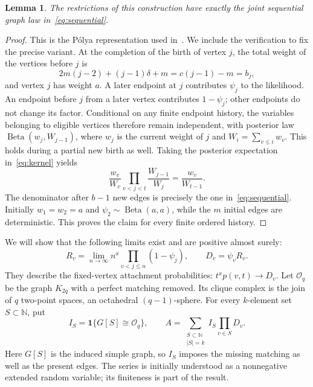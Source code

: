 \documentclass[11pt]{article}
\newtheorem{lemma}[theorem]{Lemma}
\theoremstyle{remark}\newtheorem{remark}[theorem]{Remark}
\newcommand{\N}{\mathbb N}
\newcommand{\ind}{\mathbf 1}
\newcommand{\cO}{\mathcal O}
\begin{document}
\begin{lemma}\label{lem:model}
The restrictions of this construction have exactly the joint sequential
graph law in~\eqref{eq:sequential}.
\end{lemma}
\begin{proof}
This is the P\'olya representation used in~\cite[Definition~5.1 and
Theorem~5.2 of the author preprint]{siu}. We include the verification to fix
the precise variant. At the completion of the birth of vertex $j$, the
total weight of the vertices before $j$ is
\[
 2m(j-2)+(j-1)\delta+m=c(j-1)-m=b_j,
\]
and vertex $j$ has weight $a$. A later endpoint at $j$ contributes $\psi_j$
to the likelihood. An endpoint before $j$ from a later vertex contributes
$1-\psi_j$; other endpoints do not change its factor. Conditional on any
finite endpoint history, the variables belonging to eligible vertices
therefore remain independent, with posterior law
$\operatorname{Beta}(w_j,W_{j-1})$, where $w_j$ is the current weight
of $j$ and $W_i=\sum_{v\le i}w_v$.
This holds during a partial new birth as well. Taking the posterior
expectation in~\eqref{eq:kernel} yields
\[
 \frac{w_v}{W_v}\prod_{v<j<t}\frac{W_{j-1}}{W_j}
 =\frac{w_v}{W_{t-1}}.
\]
The denominator after $b-1$ new edges is precisely the one
in~\eqref{eq:sequential}. Initially $w_1=w_2=a$ and
$\psi_2\sim\operatorname{Beta}(a,a)$, while the $m$ initial edges are
deterministic. This proves the claim for every finite ordered history.
\end{proof}

We will show that the following limits exist and are positive almost surely:
\begin{equation}\label{eq:weights}
 R_v=\lim_{n\to\infty}n^x\prod_{v<j\le n}(1-\psi_j),
 \qquad D_v=\psi_v R_v.
\end{equation}
They describe the fixed-vertex attachment probabilities:
$t^x p(v,t)\to D_v$.
Let $\cO_q$ be the graph $K_{2q}$ with a perfect matching removed.
Its clique complex is the join of $q$ two-point spaces, an octahedral
$(q-1)$-sphere. For every $k$-element set $S\subset\N$, put
\begin{equation}\label{eq:coefficient}
 I_S=\ind\{G[S]\cong\cO_q\},\qquad
 A=\sum_{\substack{S\subset\N\\ |S|=k}} I_S\prod_{v\in S}D_v.
\end{equation}
Here $G[S]$ is the induced simple graph, so $I_S$ imposes the missing
matching as well as the present edges. The series is initially understood
as a nonnegative extended random variable; its finiteness is part of the result.
\end{document}
